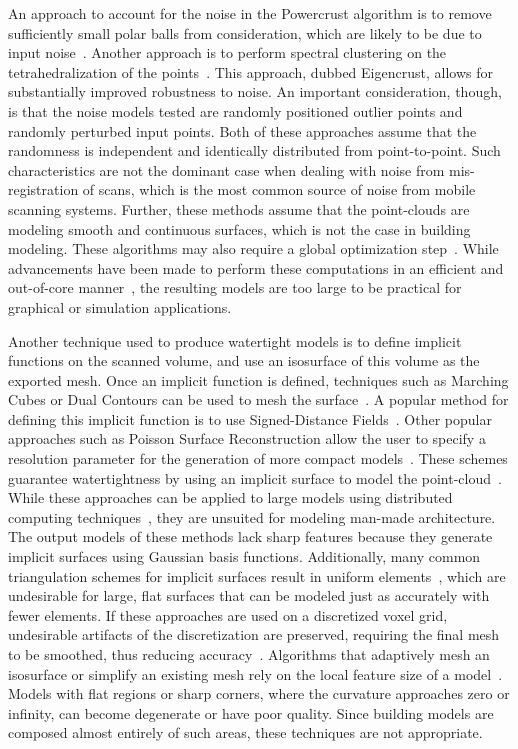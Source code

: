 \documentclass[12pt,onecolumn,oneside]{book}
\begin{document}
An approach to account for the noise in the Powercrust algorithm is to remove sufficiently small polar balls from consideration, which are likely to be due to input noise~\cite{NoisyPowercrust}.  Another approach is to perform spectral clustering on the tetrahedralization of the points~\cite{EigencrustShewchuk}.  This approach, dubbed Eigencrust, allows for substantially improved robustness to noise.  An important consideration, though, is that the noise models tested are randomly positioned outlier points and randomly perturbed input points.  Both of these approaches assume that the randomness is independent and identically distributed from point-to-point.  Such characteristics are not the dominant case when dealing with noise from mis-registration of scans, which is the most common source of noise from mobile scanning systems.  Further, these methods assume that the point-clouds are modeling smooth and continuous surfaces, which is not the case in building modeling.  These algorithms may also require a global optimization step~\cite{EigencrustShewchuk}.  While advancements have been made to perform these computations in an efficient and out-of-core manner~\cite{RealTimeEigenCrust,StreamingDelaunay}, the resulting models are too large to be practical for graphical or simulation applications.

Another technique used to produce watertight models is to define implicit functions on the scanned volume, and use an isosurface of this volume as the exported mesh.  Once an implicit function is defined, techniques such as Marching Cubes or Dual Contours can be used to mesh the surface~\cite{MarchingCubes,DualContouring}. A popular method for defining this implicit function is to use Signed-Distance Fields~\cite{SignedDistanceFields}.  Other popular approaches such as Poisson Surface Reconstruction allow the user to specify a resolution parameter for the generation of more compact models~\cite{Poisson}.  These schemes guarantee watertightness by using an implicit surface to model the point-cloud~\cite{UnorganizedPoints}.  While these approaches can be applied to large models using distributed computing techniques~\cite{OutOfCorePoisson,ParallelPoisson}, they are unsuited for modeling man-made architecture.  The output models of these methods lack sharp features because they generate implicit surfaces using Gaussian basis functions.  Additionally, many common triangulation schemes for implicit surfaces result in uniform elements~\cite{DualContouring,MarchingCubes}, which are undesirable for large, flat surfaces that can be modeled just as accurately with fewer elements.  If these approaches are used on a discretized voxel grid, undesirable artifacts of the discretization are preserved, requiring the final mesh to be smoothed, thus reducing accuracy~\cite{Carving}.  Algorithms that adaptively mesh an isosurface or simplify an existing mesh rely on the local feature size of a model~\cite{QEM,ProgressiveMesh,Isostuffing,AdaptiveMeshing}.  Models with flat regions or sharp corners, where the curvature approaches zero or infinity, can become degenerate or have poor quality.  Since building models are composed almost entirely of such areas, these techniques are not appropriate.
\end{document}
